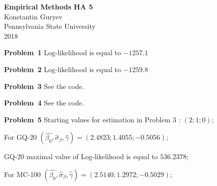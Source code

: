 \documentclass[a4paper,12pt]{article}
\begin{document}
\maketitle \hrulefill
{}

\begin{center}

\textbf {\Large{Empirical Methods HA 5}}\\
Konstantin Guryev\\
Pennsylvania State University\\
2018
\end{center}

\textbf{Problem \textnumero \,1 }
Log-likelihood is equal to $-1257.1$

\textbf{Problem \textnumero \,2 }
Log-likelihood is equal to $-1259.8$

\textbf{Problem \textnumero \,3 }
See the code. 


\textbf{Problem \textnumero \,4 }
See the code. 

\textbf{Problem \textnumero \,5 }
Starting values for estimation in Problem 3 : $(2;1;0)$;

For GQ-20 $(\hat{\beta_{0}},\hat{\sigma}_{\beta},\hat{\gamma}) = (2.4823;1.4055;-0.5056)$;

GQ-20 maximal value of Log-likelihood is equal to $536.2378$;

For MC-100 $(\hat{\beta_{0}},\hat{\sigma}_{\beta},\hat{\gamma}) = (2.5140;1.2972;-0.5029)$;
\end{document}

